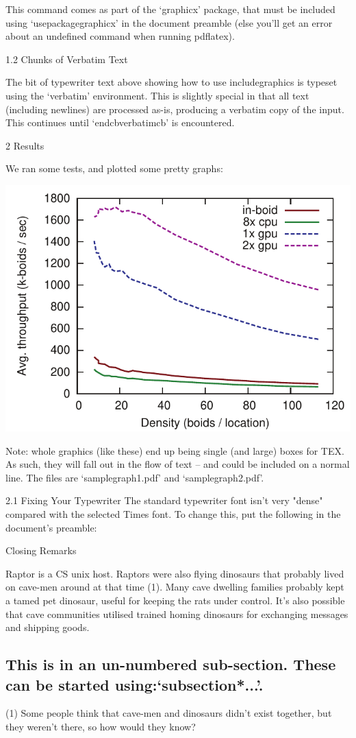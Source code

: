 \documentclass[a4paper,12pt]{article}
\begin{document}
This command comes as part of the `graphicx' package, that must be included using
`usepackage{graphicx}' in the document preamble (else you'll get an error about
an undefined command when running pdflatex).

1.2 Chunks of Verbatim Text

The bit of typewriter text above showing how to use includegraphics is typeset
using the `verbatim' environment. This is slightly special in that all text
(including newlines) are processed as-is, producing a verbatim copy of the input.
This continues until `endcbverbatimcb' is encountered.

2 Results

We ran some tests, and plotted some pretty graphs:

\includegraphics[scale=0.5]{samplegraph2.pdf}

Note: whole graphics (like these) end up being single (and large) boxes for
TEX. As such, they will fall out in the flow of text -- and could be included on a
normal line. The files are `samplegraph1.pdf' and `samplegraph2.pdf'.

2.1 Fixing Your Typewriter
The standard typewriter font isn't very "dense" compared with the selected Times
font. To change this, put the following in the document's preamble:

\renewcommand{\ttdefault}{cmtt}

Closing Remarks

Raptor is a CS unix host. Raptors were also flying dinosaurs that probably lived
on cave-men around at that time (1). Many cave dwelling families probably kept
a tamed pet dinosaur, useful for keeping the rats under control. It's also possible
that cave communities utilised trained homing dinosaurs for exchanging messages
and shipping goods.
\subsection*{This is in an un-numbered sub-section. These can be started using:`subsection*{...}'.}

(1) Some people think that cave-men and dinosaurs didn't exist together, but they weren't there,
so how would they know?
\end{document}
